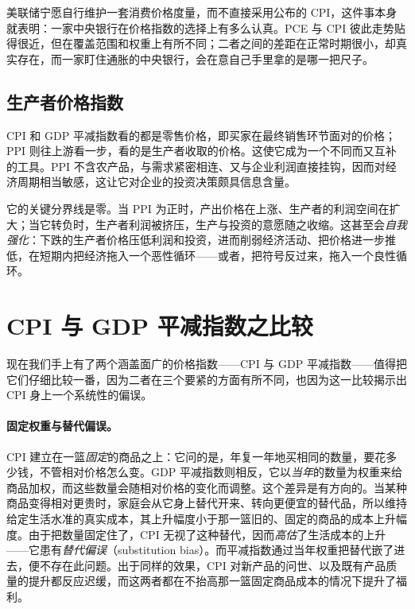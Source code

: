 
美联储宁愿自行维护一套消费价格度量，而不直接采用公布的 CPI，这件事本身就表明：一家中央银行在价格指数的选择上有多么认真。PCE 与 CPI 彼此走势贴得很近，但在覆盖范围和权重上有所不同；二者之间的差距在正常时期很小，却真实存在，而一家盯住通胀的中央银行，会在意自己手里拿的是哪一把尺子。

\subsection{生产者价格指数}


CPI 和 GDP 平减指数看的都是零售价格，即买家在最终销售环节面对的价格；PPI 则往上游看一步，看的是生产者收取的价格。这使它成为一个不同而又互补的工具。PPI 不含农产品，与需求紧密相连、又与企业利润直接挂钩，因而对经济周期相当敏感，这让它对企业的投资决策颇具信息含量。

它的关键分界线是零。当 PPI 为正时，产出价格在上涨、生产者的利润空间在扩大；当它转负时，生产者利润被挤压，生产与投资的意愿随之收缩。这甚至会\emph{自我强化}：下跌的生产者价格压低利润和投资，进而削弱经济活动、把价格进一步推低，在短期内把经济拖入一个恶性循环——或者，把符号反过来，拖入一个良性循环。


\section{CPI 与 GDP 平减指数之比较}

现在我们手上有了两个涵盖面广的价格指数——CPI 与 GDP 平减指数——值得把它们仔细比较一番，因为二者在三个要紧的方面有所不同，也因为这一比较揭示出 CPI 身上一个系统性的偏误。

\paragraph{固定权重与替代偏误。} CPI 建立在一篮\emph{固定}的商品之上：它问的是，年复一年地买相同的数量，要花多少钱，不管相对价格怎么变。GDP 平减指数则相反，它以\emph{当年}的数量为权重来给商品加权，而这些数量会随相对价格的变化而调整。这个差异是有方向的。当某种商品变得相对更贵时，家庭会从它身上替代开来、转向更便宜的替代品，所以维持给定生活水准的真实成本，其上升幅度小于那一篮旧的、固定的商品的成本上升幅度。由于把数量固定住了，CPI 无视了这种替代，因而\emph{高估}了生活成本的上升——它患有\emph{替代偏误}（substitution bias）。而平减指数通过当年权重把替代嵌了进去，便不存在此问题。出于同样的效果，CPI 对新产品的问世、以及既有产品质量的提升都反应迟缓，而这两者都在不抬高那一篮固定商品成本的情况下提升了福利。

